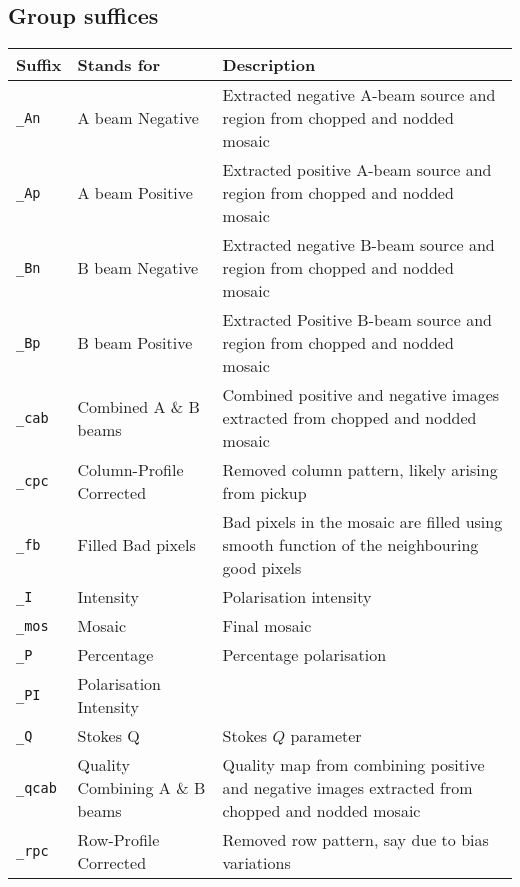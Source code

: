 \documentclass[twoside,11pt,nolof]{starlink}
\begin{document}
\subsection*{Group suffices}%
\begin{tabular}{llp{79mm}}
\hline
  Suffix   & Stands for             & Description \\ \hline
{\tt\_An}  & A beam Negative        & Extracted negative A-beam source and
                                      region from chopped and nodded mosaic \\
{\tt\_Ap}  & A beam Positive        & Extracted positive A-beam source and
                                      region from chopped and nodded mosaic \\
{\tt\_Bn}  & B beam Negative        & Extracted negative B-beam source and
                                      region from chopped and nodded mosaic \\
{\tt\_Bp}  & B beam Positive        & Extracted Positive B-beam source and
                                      region from chopped and nodded mosaic \\
{\tt\_cab} & Combined A \& B beams  & Combined positive and negative images
                                      extracted from chopped and nodded mosaic \\
{\tt\_cpc} & Column-Profile Corrected  & Removed column pattern, likely arising
                                      from pickup \\
{\tt\_fb}  & Filled Bad pixels      & Bad pixels in the mosaic are filled using
                                      smooth function of the neighbouring good
                                      pixels \\
{\tt\_I}   & Intensity              & Polarisation intensity \\
{\tt\_mos} & Mosaic                 & Final mosaic \\
{\tt\_P}   & Percentage             & Percentage polarisation \\
{\tt\_PI}  & Polarisation Intensity & \\
{\tt\_Q}   & Stokes Q               & Stokes $Q$ parameter \\
{\tt\_qcab} & Quality Combining A \& B beams  & Quality map from combining positive and
                                      negative images extracted from chopped and nodded mosaic \\
{\tt\_rpc} & Row-Profile Corrected  & Removed row pattern, say due to bias
                                      variations \\

\end{tabular}
\end{document}
